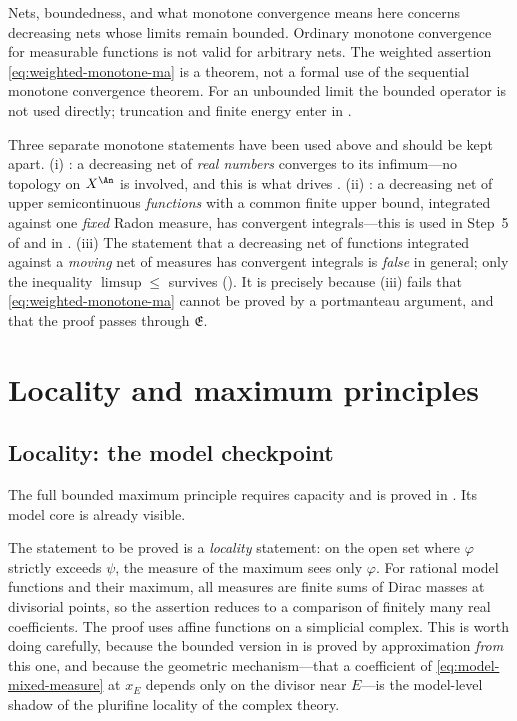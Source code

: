 \begin{warning}{Nets, boundedness, and what monotone convergence means here}
\label{warn:ch24-monotone-nets}
 concerns decreasing nets whose limits
remain bounded. Ordinary monotone convergence for measurable functions is
not valid for arbitrary nets. The weighted assertion
\eqref{eq:weighted-monotone-ma} is a theorem, not a formal use of the
sequential monotone convergence theorem. For an unbounded limit the bounded
operator is not used directly; truncation and finite energy enter in
.

Three separate monotone statements have been used above and should be kept
apart.  (i) : a decreasing net of
\emph{real numbers} converges to its infimum---no topology on $X^{\An}$ is
involved, and this is what drives
.  (ii)
: a decreasing net of upper
semicontinuous \emph{functions} with a common finite upper bound,
integrated against one \emph{fixed} Radon measure, has convergent integrals---this is used in Step~5 of
 and in
.  (iii) The statement that a
decreasing net of functions integrated against a \emph{moving} net of
measures has convergent integrals is \emph{false} in general; only the
inequality $\limsup\leq$ survives
().  It is precisely because (iii) fails
that \eqref{eq:weighted-monotone-ma} cannot be proved by a portmanteau
argument, and that the proof passes through $\mathfrak E$.
\end{warning}

\section{Locality and maximum principles}
\label{sec:ch24-locality}

\subsection{Locality: the model checkpoint}
\label{sec:ch24-model-locality}

The full bounded maximum principle requires capacity and is proved in
. Its model core is already
visible.

The statement to be proved is a \emph{locality} statement: on the open set
where $\varphi$ strictly exceeds $\psi$, the measure of the maximum sees
only $\varphi$.  For rational model functions and their maximum, all measures are finite
sums of Dirac masses at divisorial points, so the assertion reduces to a
comparison of finitely many real coefficients.  The proof uses affine functions
on a simplicial complex.  This is worth doing carefully, because the bounded
version in  is proved by approximation \emph{from}
this one, and because the geometric mechanism---that a coefficient of
\eqref{eq:model-mixed-measure} at $x_E$ depends only on the divisor near
$E$---is the model-level shadow of the plurifine locality of the complex
theory.

